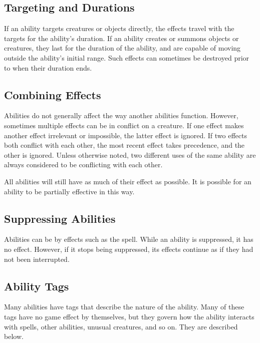         \subsection{Targeting and Durations}
            If an ability targets creatures or objects directly, the effects travel with the targets for the ability's duration.
            If an ability creates or summons objects or creatures, they last for the duration of the ability, and are capable of moving outside the ability's initial range.
            Such effects can sometimes be destroyed prior to when their duration ends.

    \subsection{Combining Effects}
        Abilities do not generally affect the way another abilities function.
        However, sometimes multiple effects can be in conflict on a creature.
        If one effect makes another effect irrelevant or impossible, the latter effect is ignored.
        If two effects both conflict with each other, the most recent effect takes precedence, and the other is ignored.
        Unless otherwise noted, two different uses of the same ability are always considered to be conflicting with each other.

        All abilities will still have as much of their effect as possible.
        It is possible for an ability to be partially effective in this way.

    \subsection{Suppressing Abilities}\label{Suppressing Abilities}
        Abilities can be  by effects such as the  spell.
        While an ability is suppressed, it has no effect.
        However, if it stops being suppressed, its effects continue as if they had not been interrupted.

    \subsection{Ability Tags}\label{Ability Tags}

        Many abilities have tags that describe the nature of the ability.
        Many of these tags have no game effect by themselves, but they govern how the ability interacts with spells, other abilities, unusual creatures, and so on.
        They are described below.

